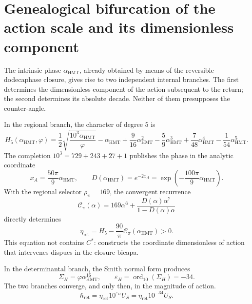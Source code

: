 
\section{Genealogical bifurcation of the action scale and its dimensionless component}
\label{sec:sucesor-102-c14-bifurcacion-accion}

The intrinsic phase \(\alpha_{\mathrm{HMT}}\), already obtained by means of the
reversible dodecaphase closure, gives rise to two independent internal branches.
The first determines the dimensionless component of the action subsequent to the
return; the second determines its absolute decade. Neither of them presupposes
the counter-angle.

In the regional branch, the character of degree \(5\) is
\begin{equation}
 H_5(\alpha_{\mathrm{HMT}},\varphi)
 =\frac12\sqrt{\frac{10^3\alpha_{\mathrm{HMT}}}{\varphi}}
  -\alpha_{\mathrm{HMT}}
  +\frac9{16}\alpha_{\mathrm{HMT}}^2
  -\frac59\alpha_{\mathrm{HMT}}^3
  +\frac7{48}\alpha_{\mathrm{HMT}}^4
  -\frac1{54}\alpha_{\mathrm{HMT}}^5 .
 \label{eq:sucesor-102-c14-h5-preangular}
\end{equation}
The completion \(10^3=729+243+27+1\) publishes the phase in the analytic
coordinate
\begin{equation}
 x_A=\frac{50\pi}{9}\alpha_{\mathrm{HMT}},
 \qquad
 D(\alpha_{\mathrm{HMT}})=e^{-2x_A}
 =\exp\!\left(-\frac{100\pi}{9}\alpha_{\mathrm{HMT}}\right).
 \label{eq:sucesor-102-c14-determinante-regional}
\end{equation}
With the regional selector \(\rho_\pi=169\), the convergent recurrence
\begin{equation}
 \mathscr C_\pi(\alpha)
 =169\alpha^6+
   \frac{D(\alpha)\alpha^7}{1-D(\alpha)\alpha}
 \label{eq:sucesor-102-c14-recurrencia-regional}
\end{equation}
directly determines
\begin{equation}
 \boxed{\eta_{\mathrm{ret}}
 =H_5-\frac{90}{\pi}\mathscr C_\pi(\alpha_{\mathrm{HMT}})>0.}
 \label{eq:sucesor-102-c14-eta-directa}
\end{equation}
This equation not contains \(C^*\): constructs the coordinate dimensionless of
action that intervenes dispues in the closure bicapa.

In the determinantal branch, the Smith normal form produces
\begin{equation}
 \Sigma_H=\varphi\alpha_{\mathrm{HMT}}^{16},
 \qquad
 \varepsilon_H=\operatorname{ord}_{10}(\Sigma_H)=-34.
 \label{eq:sucesor-102-c14-decada-accion}
\end{equation}
The two branches converge, and only then, in the magnitude of action.
\begin{equation}
 \boxed{\hbar_{\mathrm{ret}}
 =\eta_{\mathrm{ret}}10^{\varepsilon_H}U_S
 =\eta_{\mathrm{ret}}10^{-34}U_S.}
 \label{eq:sucesor-102-c14-hbar-tipado}
\end{equation}

